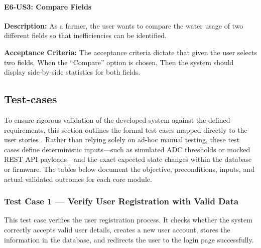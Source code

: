 \paragraph{E6-US3: Compare Fields}

\textbf{Description:} As a farmer, the user wants to compare the 
water usage of two different fields so that inefficiencies can be 
identified.

\textbf{Acceptance Criteria:} The acceptance criteria dictate that given the user selects two fields, When the ``Compare'' option is chosen, Then the system should display side-by-side statistics for both fields.


\subsection{Test-cases}

To ensure rigorous validation of the developed system against the defined 
requirements, this section outlines the formal test cases mapped directly 
to the user stories \cite{tahir2019traceability}. Rather than relying 
solely on ad-hoc manual testing, these test cases define deterministic 
inputs—such as simulated ADC thresholds or mocked REST API payloads—and 
the exact expected state changes within the database or firmware. 
The tables below document the objective, preconditions, inputs, and 
actual validated outcomes for each core module.

\subsubsection{Test Case 1 --- Verify User Registration with Valid 
Data}

This test case verifies the user registration process. It checks 
whether the system correctly accepts valid user details, creates a 
new user account, stores the information in the database, and 
redirects the user to the login page successfully.

